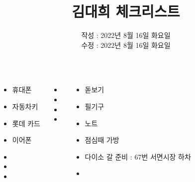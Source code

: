 \documentclass[	20pt, 
							a1paper, 
							portrait, %
							margin=0mm, %
							innermargin=10mm,  		%
							blockverticalspace=4mm, %
							colspace=5mm, 
							subcolspace=0mm
							]{tikzposter}
\title{김대희 체크리스트 }
\author{ 	작성 : 2022년 8월 16일 화요일 \\
				수정 : 2022년 8월 16일 화요일 }
\begin{document}
	\maketitle



	\begin{columns}


			{
				\begin{LARGE}
					\begin{itemize}
					\item 휴대폰
					\item 자동차키
					\item 롯데 카드
					\item 이어폰
					\item 
					\item 
					\item 
					\end{itemize}
				\end{LARGE}
			}


			{
				\begin{LARGE}
					\begin{itemize}
					\item 
					\item 
					\item 
					\item 
					\end{itemize}
				\end{LARGE}
			}

			{
				\begin{LARGE}
					\begin{itemize}
					\item 돋보기
					\item 필기구
					\item 노트
					\item 점심때 가방
					\item 다이소 갈 준비 : 67번 서면시장 하차
					\item 

					\end{itemize}
				\end{LARGE}
			}


\end{columns}
\end{document}
